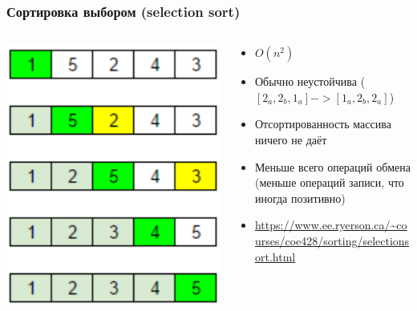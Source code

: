 \documentclass[xetex,mathserif,serif]{beamer}
\begin{document}
	\begin{frame}
		\frametitle{Сортировка выбором (selection sort)}
		\begin{columns}
			\begin{column}{0.25\textwidth}
				\includegraphics[width=\textwidth]{selectSort.png}
			\end{column}
			\begin{column}{0.75\textwidth}
				\begin{itemize}
					\item $O(n^2)$
					\item Обычно неустойчива ($[2_a, 2_b, 1_a] -> [1_a, 2_b, 2_a]$)
					\item Отсортированность массива ничего не даёт
					\item Меньше всего операций обмена (меньше операций записи, что иногда позитивно)
					\item \url{https://www.ee.ryerson.ca/~courses/coe428/sorting/selectionsort.html}
				\end{itemize}
			\end{column}
		\end{columns}
	\end{frame}
\end{document}
